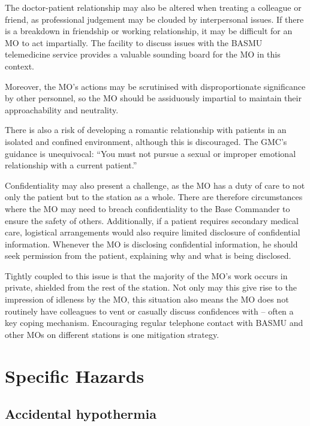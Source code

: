 \documentclass[12pt,a4paper]{article}
\begin{document}
The doctor-patient relationship may also be altered when treating a colleague or friend, as professional judgement may be clouded by interpersonal issues. If there is a breakdown in friendship or working relationship, it may be difficult for an MO to act impartially. The facility to discuss issues with the BASMU telemedicine service provides a valuable sounding board for the MO in this context.

Moreover, the MO's actions may be scrutinised with disproportionate significance by other personnel, so the MO should be assiduously impartial to maintain their approachability and neutrality.

There is also a risk of developing a romantic relationship with patients in an isolated and confined environment, although this is discouraged. The GMC's guidance is unequivocal: ``You must not pursue a sexual or improper emotional relationship with a current patient.''\cite{Anonymous:2013wj,Anonymous:2013ve}

Confidentiality may also present a challenge, as the MO has a duty of care to not only the patient but to the station as a whole. There are therefore circumstances where the MO may need to breach confidentiality to the Base Commander to ensure the safety of others. Additionally, if a patient requires secondary medical care, logistical arrangements would also require limited disclosure of confidential information. Whenever the MO is disclosing confidential information, he should seek permission from the patient, explaining why and what is being disclosed.\cite{Anonymous:2013ta}

Tightly coupled to this issue is that the majority of the MO's work occurs in private, shielded from the rest of the station. Not only may this give rise to the impression of idleness by the MO, this situation also means the MO does not routinely have colleagues to vent or casually discuss confidences with -- often a key coping mechanism. Encouraging regular telephone contact with BASMU and other MOs on different stations is one mitigation strategy.

\section{Specific Hazards}

\subsection{Accidental hypothermia}
\end{document}
